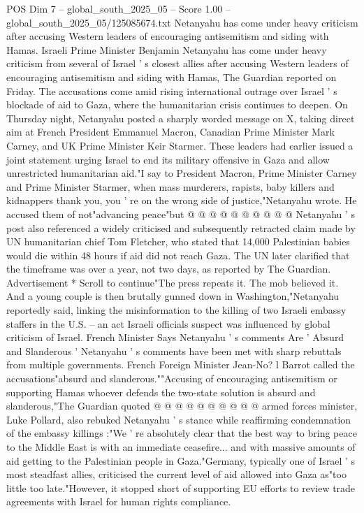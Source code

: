 \begin{textsample}{POS Dim 7 – global\_south\_2025\_05 – Score 1.00 – global\_south\_2025\_05/125085674.txt}  \label{ex:f7_pos_236}
Netanyahu has come under heavy criticism after accusing Western leaders of encouraging antisemitism and siding with Hamas.
Israeli Prime Minister Benjamin Netanyahu has come under heavy criticism from several of Israel ' s closest allies after accusing Western leaders of encouraging antisemitism and siding with Hamas, The Guardian reported on Friday.
The accusations come amid rising international outrage over Israel ' s blockade of aid to Gaza, where the humanitarian crisis continues to deepen.
On Thursday night, Netanyahu posted a sharply worded message on X, taking direct aim at French President Emmanuel Macron, Canadian Prime Minister Mark Carney, and UK Prime Minister Keir Starmer.
These leaders had earlier issued a joint statement urging Israel to end its military offensive in Gaza and allow unrestricted humanitarian aid."I say to President Macron, Prime Minister Carney and Prime Minister Starmer, when mass murderers, rapists, baby killers and kidnappers thank you, you ' re on the wrong side of justice,"Netanyahu wrote.
He accused them of not"advancing peace"but @ @ @ @ @ @ @ @ @ @ Netanyahu ' s post also referenced a widely criticised and subsequently retracted claim made by UN humanitarian chief Tom Fletcher, who stated that 14,000 Palestinian babies would die within 48 hours if aid did not reach Gaza.
The UN later clarified that the timeframe was over a year, not two days, as reported by The Guardian.
Advertisement * Scroll to continue"The press repeats it.
The mob believed it.
And a young couple is then brutally gunned down in Washington,"Netanyahu reportedly said, linking the misinformation to the killing of two Israeli embassy staffers in the U.S. -- an act Israeli officials suspect was influenced by global criticism of Israel.
French Minister Says Netanyahu ' s comments Are ' Absurd and Slanderous ' Netanyahu ' s comments have been met with sharp rebuttals from multiple governments.
French Foreign Minister Jean-No? l Barrot called the accusations"absurd and slanderous.""Accusing of encouraging antisemitism or supporting Hamas whoever defends the two-state solution is absurd and slanderous,"The Guardian quoted @ @ @ @ @ @ @ @ @ @ armed forces minister, Luke Pollard, also rebuked Netanyahu ' s stance while reaffirming condemnation of the embassy killings :"We ' re absolutely clear that the best way to bring peace to the Middle East is with an immediate ceasefire... and with massive amounts of aid getting to the Palestinian people in Gaza."Germany, typically one of Israel ' s most steadfast allies, criticised the current level of aid allowed into Gaza as"too little too late."However, it stopped short of supporting EU efforts to review trade agreements with Israel for human rights compliance.

\end{textsample}
